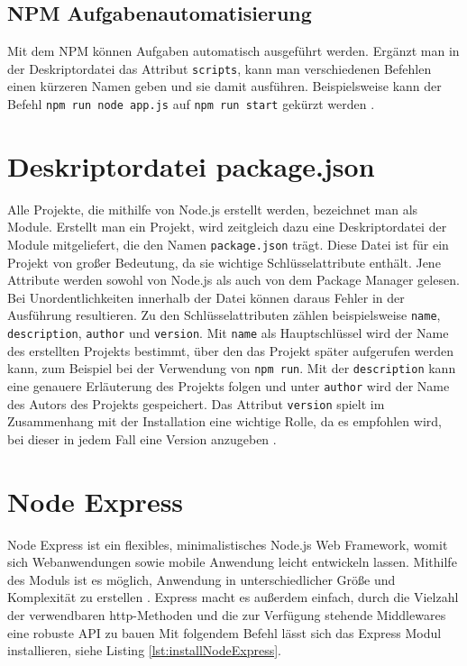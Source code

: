 \subsection{NPM Aufgabenautomatisierung}

Mit dem NPM können Aufgaben automatisch ausgeführt werden. Ergänzt man in der Deskriptordatei das Attribut \texttt{scripts}, kann man verschiedenen Befehlen einen kürzeren Namen geben und sie damit ausführen. Beispielsweise kann der Befehl \texttt{npm run node app.js} auf \texttt{npm run start} gekürzt werden \cite[S.12]{neins}. 

\section{Deskriptordatei package.json}
Alle Projekte, die mithilfe von Node.js erstellt werden, bezeichnet man als Module. Erstellt man ein Projekt, wird zeitgleich dazu eine Deskriptordatei der Module mitgeliefert, die den Namen \texttt{package.json} trägt. Diese Datei ist für ein Projekt von großer Bedeutung, da sie wichtige Schlüsselattribute enthält. Jene Attribute werden sowohl von Node.js als auch von dem Package Manager gelesen. Bei Unordentlichkeiten innerhalb der Datei können daraus Fehler in der Ausführung resultieren. 
Zu den Schlüsselattributen zählen beispielsweise \texttt{name}, \texttt{description}, \texttt{author} und \texttt{version}. Mit \texttt{name} als Hauptschlüssel wird der Name des erstellten Projekts bestimmt, über den das Projekt später aufgerufen werden kann, zum Beispiel bei der Verwendung von \texttt{npm run}. Mit der \texttt{description} kann eine genauere Erläuterung des Projekts folgen und unter \texttt{author} wird der Name des Autors des Projekts gespeichert. Das Attribut \texttt{version} spielt im Zusammenhang mit der Installation eine wichtige Rolle, da es empfohlen wird, bei dieser in jedem Fall eine Version anzugeben \cite[S.10f.]{neins}. 

\section{Node Express}

Node Express ist ein flexibles, minimalistisches Node.js Web Framework, womit sich Webanwendungen sowie mobile Anwendung leicht entwickeln lassen. Mithilfe des Moduls ist es möglich, Anwendung in unterschiedlicher Größe und Komplexität zu erstellen \cite[S.16]{neins}. Express macht es außerdem einfach, durch die Vielzahl der verwendbaren http-Methoden und die zur Verfügung stehende Middlewares eine robuste API zu bauen \cite{ndrei}
Mit folgendem Befehl lässt sich das Express Modul installieren, siehe Listing \ref*{lst:installNodeExpress}.

